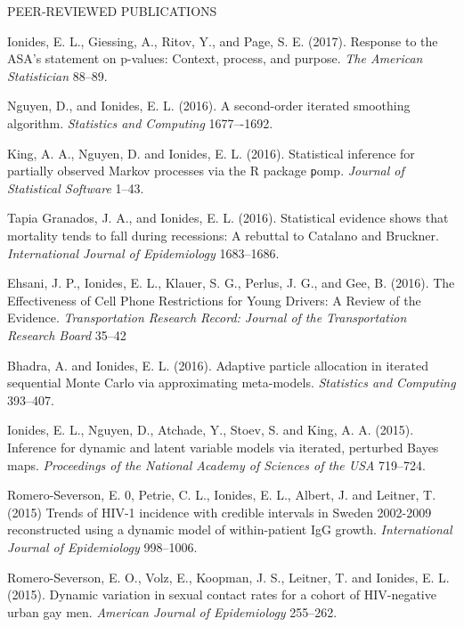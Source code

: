 \begin{reflist}{PEER-REVIEWED PUBLICATIONS}
\item Ionides, E. L., Giessing, A., Ritov, Y., and Page, S. E. (2017).
Response to the ASA's statement on p-values: Context, process, and purpose. {\em The American Statistician} {}{\separator}88--89.

\item Nguyen, D., and Ionides, E. L. (2016). A second-order iterated smoothing algorithm. {\em Statistics and Computing} {}{\separator}1677–-1692.

\item King, A. A., Nguyen, D. and Ionides, E. L. (2016). Statistical inference for partially observed Markov processes via the R package {\texttt pomp}. {\em Journal of Statistical Software} {}{\separator}1--43.

\item  Tapia Granados, J. A.,  and Ionides, E. L. (2016). Statistical evidence shows that mortality tends to fall during recessions: A rebuttal to Catalano and Bruckner. {\em International Journal of Epidemiology} {}{\separator}1683--1686.

\item Ehsani, J. P.,  Ionides, E. L., Klauer, S. G., Perlus,  J. G., and Gee, B. (2016). The Effectiveness of Cell Phone Restrictions for Young Drivers: A Review of the Evidence. {\em Transportation Research Record: Journal of the Transportation Research Board} {}{\separator}35–42

\item
Bhadra, A. and Ionides, E. L. (2016). Adaptive particle allocation in iterated sequential Monte Carlo via approximating meta-models. {\em Statistics and Computing} {}{\separator}393--407.

\item Ionides, E. L., Nguyen, D., Atchade, Y., Stoev, S. and King, A. A. (2015). Inference for dynamic and latent variable models via iterated, perturbed Bayes maps.  {\em Proceedings of the National Academy of Sciences of the USA} {}{\separator}719--724.

\item Romero-Severson, E. 0, Petrie, C. L., Ionides, E. L., Albert, J. and Leitner, T. (2015) Trends of HIV-1 incidence with credible intervals in Sweden 2002-2009 reconstructed using a dynamic model of within-patient IgG growth. {\em International Journal of Epidemiology} {}{\separator}998--1006.


\item Romero-Severson, E. O., Volz, E., Koopman, J. S., Leitner, T. and Ionides, E. L. (2015). Dynamic variation in sexual contact rates for a cohort of HIV-negative urban gay men. {\em American Journal of Epidemiology}  {} 255--262.


\end{reflist}
